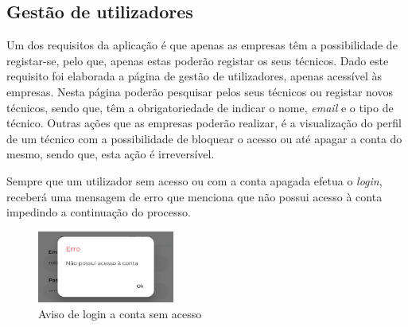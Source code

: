 \subsection{Gestão de utilizadores}
Um dos requisitos da aplicação é que apenas as empresas têm a possibilidade de registar-se, pelo que, apenas estas poderão registar os seus técnicos. Dado este requisito foi elaborada a página de gestão de utilizadores, apenas acessível às empresas. Nesta página poderão pesquisar pelos seus técnicos ou registar novos técnicos, sendo que, têm a obrigatoriedade de indicar o nome, \textit{email} e o tipo de técnico. Outras ações que as empresas poderão realizar, é a visualização do perfil de um técnico com a possibilidade de bloquear o acesso ou até apagar a conta do mesmo, sendo que, esta ação é irreversível.

\begin{figure}[htb]%
  \centering
  \qquad
  \label{fig:70}%
\end{figure}

Sempre que um utilizador sem acesso ou com a conta apagada efetua o \textit{login}, receberá uma mensagem de erro que menciona que não possui acesso à conta impedindo a continuação do processo.

\begin{figure}[htb]
  \centering
  \includegraphics[width=0.4\textwidth]{images/implementacao/frontend/gestao_users/1686054218243.jpg}
  \caption{Aviso de login a conta sem acesso}
  \label{fig:71}
\end{figure}